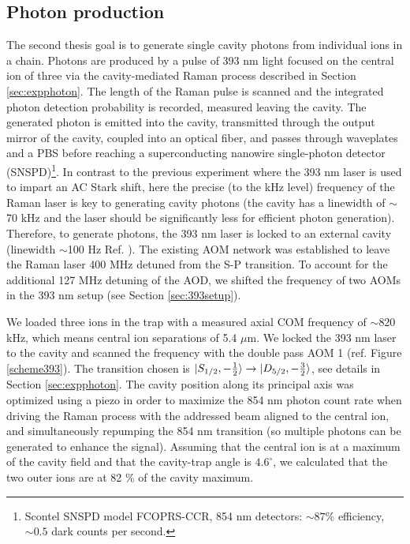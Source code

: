 \subsection{Photon production}
\label{exp:photons}
The second thesis goal is to generate single cavity photons from individual ions in a chain. Photons are produced by a pulse of 393 nm light focused on the central ion of three via the cavity-mediated Raman process described in Section \ref{sec:expphoton}. The length of the Raman pulse is scanned and the integrated photon detection probability is recorded, measured leaving the cavity. The generated photon is emitted into the cavity, transmitted through the output mirror of the cavity, coupled into an optical fiber, and passes through waveplates and a PBS before reaching a superconducting nanowire single-photon detector (SNSPD)\footnote{Scontel SNSPD model FCOPRS-CCR, 854 nm detectors: $\sim 87$\% efficiency, $\sim 0.5$ dark counts per second.}. In contrast to the previous experiment where the 393 nm laser is used to impart an AC Stark shift, here the precise (to the kHz level) frequency of the Raman laser is key to generating cavity photons (the cavity has a linewidth of $\sim$70 kHz and the laser should be significantly less for efficient photon generation). Therefore, to generate photons, the 393 nm laser is locked to an external cavity (linewidth $\sim$100 Hz Ref. \cite{helene}). The existing AOM network was established to leave the Raman laser 400 MHz detuned from the S-P transition. To account for the additional 127 MHz detuning of the AOD, we shifted the frequency of two AOMs in the 393 nm setup (see Section \ref{sec:393setup}).\par
We loaded three ions in the trap with a measured axial COM frequency of $\sim 820$ kHz, which means central ion separations of 5.4 $\mu$m. We locked the 393 nm laser to the cavity and scanned the frequency with the double pass AOM 1 (ref. Figure \ref{scheme393}). The transition chosen is $\ket{S_{1/2},-\frac{1}{2}}\to \ket{D_{5/2},-\frac{3}{2}}$, see details in Section \ref{sec:expphoton}. The cavity position along its principal axis was optimized using a piezo in order to maximize the 854 nm photon count rate when driving the Raman process with the addressed beam aligned to the central ion, and simultaneously repumping the 854 nm transition (so multiple photons can be generated to enhance the signal). Assuming that the central ion is at a maximum of the cavity field and that the cavity-trap angle is $4.6^\circ$, we calculated that the two outer ions are at 82 \% of the cavity maximum.

